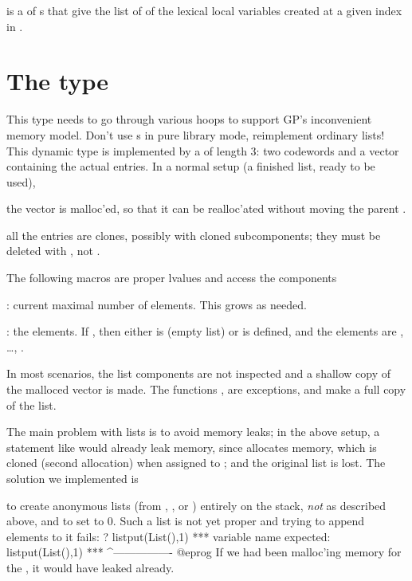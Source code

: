  is a  of s that give the list of
 of the lexical local variables created at a given index in
.

\section{The type } This type needs to go
through various hoops to support GP's inconvenient memory model. Don't
use s in pure library mode, reimplement ordinary lists! This
dynamic type is implemented by a  of length 3: two codewords and a
vector containing the actual entries. In a normal setup (a finished list,
ready to be used),

\item the vector is malloc'ed, so that it can be realloc'ated without moving
the parent .

\item all the entries are clones, possibly with cloned subcomponents; they
must be deleted with , not .

The following macros are proper lvalues and access the components

: current maximal number of elements. This grows
as needed.

: the elements. If , then
either  is  (empty list) or  is defined, and
the elements are , \dots, .

In most  scenarios, the list components are not inspected
and a shallow copy of the malloced vector is made. The functions
,  are exceptions, and make a full copy of
the list.

The main problem with lists is to avoid memory leaks; in the above setup,
a statement like  would already leak memory, since
 allocates memory, which is cloned (second allocation) when
assigned to ; and the original list is lost. The solution we
implemented is

\item to create anonymous lists (from , ,
 or ) entirely on the stack, \emph{not} as described
above, and to set  to $0$. Such a list is not yet proper and
trying to append elements to it fails:
\bprog
? listput(List(),1)
  ***   variable name expected: listput(List(),1)
  ***                                   ^----------------
@eprog\noindent
If we had been malloc'ing memory for the
, it would have leaked already.

